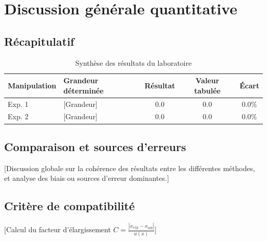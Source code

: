 \chapter{Discussion générale quantitative}
\label{chap:analyse}

\section{Récapitulatif}

\begin{table}[H]
  \centering
  \small
  \begin{tabularx}{\textwidth}{lXccc}
    \toprule
    Manipulation & Grandeur déterminée & Résultat & Valeur tabulée & Écart \\
    \midrule
    Exp. 1 & [Grandeur] & 0.0 & 0.0 & 0.0\% \\
    Exp. 2 & [Grandeur] & 0.0 & 0.0 & 0.0\% \\
    \bottomrule
  \end{tabularx}
  \caption{Synthèse des résultats du laboratoire}
  \label{tab:recap-labo}
\end{table}

\section{Comparaison et sources d'erreurs}

[Discussion globale sur la cohérence des résultats entre les différentes méthodes, et analyse des biais ou sources d'erreur dominantes.]

\section{Critère de compatibilité}

[Calcul du facteur d'élargissement $C = \frac{|x_{exp} - x_{tab}|}{u(x)}$]
